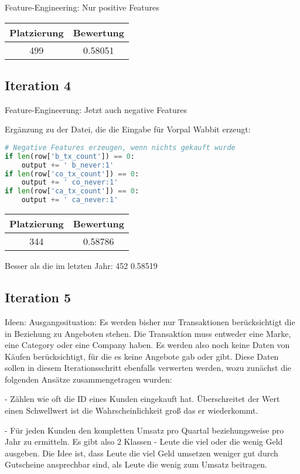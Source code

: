 Feature-Engineering: Nur positive Features

\begin{tabular}{|c|c|}
	\hline \textbf{Platzierung} & \textbf{Bewertung} \\ 
	\hline 499 & 0.58051  \\ 
	\hline 
\end{tabular}

\subsection{Iteration 4}

Feature-Engineerung: Jetzt auch negative Features

Ergänzung zu der Datei, die die Eingabe für Vorpal Wabbit erzeugt:
\begin{lstlisting}[language=Python]
# Negative Features erzeugen, wenn nichts gekauft wurde
if len(row['b_tx_count']) == 0:
	output += ' b_never:1'
if len(row['co_tx_count']) == 0:
	output += ' co_never:1'
if len(row['ca_tx_count']) == 0:
	output += ' ca_never:1'
\end{lstlisting}

\begin{tabular}{|c|c|}
	\hline \textbf{Platzierung} & \textbf{Bewertung} \\ 
	\hline 344 & 0.58786  \\ 
	\hline 
\end{tabular}

Besser als die im letzten Jahr: 452 0.58519

\subsection{Iteration 5}
	Ideen:
		Ausgangssituation: Es werden bisher nur Transaktionen berücksichtigt die in Beziehung zu Angeboten stehen. Die Transaktion muss entweder eine Marke, eine Category oder eine Company haben. Es werden also noch keine Daten von Käufen berücksichtigt, für die es keine Angebote gab oder gibt. Diese Daten sollen in diesem Iterationsschritt ebenfalls verwerten werden, wozu zunächst die folgenden Ansätze zusammengetragen wurden:
		
		- Zählen wie oft die ID eines Kunden eingekauft hat. Überschreitet der Wert einen Schwellwert ist die Wahrscheinlichkeit groß das er wiederkommt.
		
		- Für jeden Kunden den kompletten Umsatz pro Quartal beziehungsweise pro Jahr zu ermitteln. Es gibt also 2 Klassen - Leute die viel oder die wenig Geld ausgeben. Die Idee ist, dass Leute die viel Geld umsetzen weniger gut durch Gutscheine ansprechbar sind, als Leute die wenig zum Umsatz beitragen.  
		
